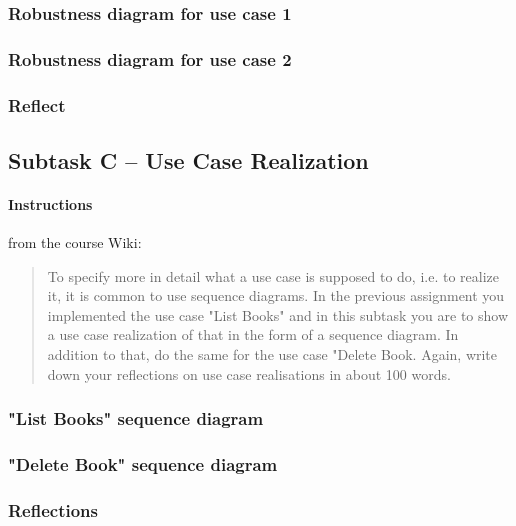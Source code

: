 \subsubsection{Robustness diagram for use case 1}\label{task-1b-robust1}
%


\subsubsection{Robustness diagram for use case 2}\label{task-1b-robust2}
%


\subsubsection{Reflect}\label{task-1b-reflect}
%



\subsection{Subtask C -- Use Case Realization}\label{task-1c}
\paragraph{Instructions}\label{task-1c-instructions}
from the course Wiki\cite{1dv600:lab2:instructions}:

\begin{quote}
  To specify more in detail what a use case is supposed to do, i.e. to realize
  it, it is common to use sequence diagrams. In the previous assignment you
  implemented the use case "List Books" and in this subtask you are to show a
  use case realization of that in the form of a sequence diagram. In addition
  to that, do the same for the use case "Delete Book.  Again, write down your
  reflections on use case realisations in about 100 words.
\end{quote}


\subsubsection{"List Books" sequence diagram}\label{task-1c-sequence1}
%


\subsubsection{"Delete Book" sequence diagram}\label{task-1c-sequence2}
%


\subsubsection{Reflections}\label{task-1c-reflect}
%

